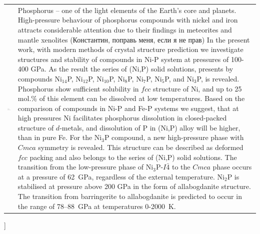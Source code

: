\documentclass[twoside,twocolumn,9pt]{article}
\begin{document}
\begin{@twocolumnfalse}
\begin{tabular}{m{4.5cm} p{13.5cm} }
\includegraphics{head_foot/dates} & \noindent\normalsize{
%
Phosphorus – one of the light elements of the Earth's core and planets.
High-pressure behaviour of phosphorus compounds with nickel and iron attracts considerable attention due to their findings in meteorites and mantle xenolites {\color{red}(Константин, поправь меня, если я не прав)}
In the present work, with modern methods of crystal structure prediction we investigate structures and stability of compounds in Ni-P system at pressures of 100-400 GPa.
As the result the series of (Ni,P) solid solutions, presents by compounds Ni$_{14}$P, Ni$_{12}$P, Ni$_{10}$P, Ni$_8$P, Ni$_7$P, Ni$_5$P, and Ni$_3$P, is revealed.
Phosphorus show sufficient solubility in $fcc$ structure of Ni, and up to 25 mol.\% of this element can be dissolved at low temperatures.
Based on the comparison of compounds in Ni-P and Fe-P systems we suggest, that at high pressures Ni facilitates phosphorus dissolution in closed-packed structure of $d$-metals, and dissolution of P in (Ni,P) alloy will be higher, than in pure Fe.
For the Ni$_3$P compound, a new high-pressure phase with $Cmca$ symmetry is revealed. 
This structure can be described as deformed $fcc$ packing and also belongs to the series of (Ni,P) solid solutions.
The transition from the low-pressure phase of Ni$_3$P-$I\bar{4}$ to the $Cmca$ phase occurs at a pressure of 62~GPa, regardless of the external temperature. 
Ni$_2$P is stabilised at pressure above 200 GPa in the form of allabogdanite structure.
The transition from barringerite to allabogdanite is predicted to occur in the range of 78--88~GPa at temperatures 0-2000~K. 


%
} \\%

\end{tabular}

 \end{@twocolumnfalse} \vspace{0.6cm}

]

\renewcommand*\rmdefault{bch}\normalfont\upshape
\rmfamily
\end{document}
